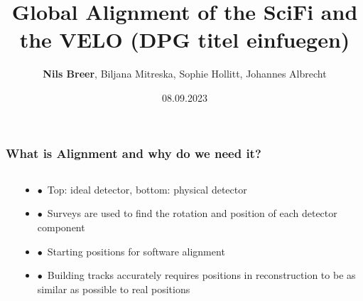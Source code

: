 \documentclass[aspectratio=1610, 12pt, xcolor=dvipsnames]{beamer}
\title{Global Alignment of the SciFi and the VELO (DPG titel einfuegen)}
\author[N.Breer]{\textbf{Nils Breer}, Biljana Mitreska, Sophie Hollitt, Johannes Albrecht}
\institute{DPG Conference, Karlsruhe}
\date{08.09.2023}
\begin{document}
\maketitle


\begin{frame}\frametitle{What is Alignment and why do we need it?}
  \begin{columns}
    \begin{column}[c]{0.48\textwidth}
      
    \end{column}
    \begin{column}[c]{0.48\textwidth}
      \begin{itemize}
        \item $\bullet$\, Top: ideal detector, bottom: physical detector
        \item $\bullet$\, Surveys are used to find the rotation and position of each detector component
        \item $\bullet$\, \to Starting positions for software alignment
        \item $\bullet$\, Building tracks accurately requires positions in reconstruction to be as similar as possible to real positions
      \end{itemize}
    \end{column}
  \end{columns}
\end{frame}
\end{document}
